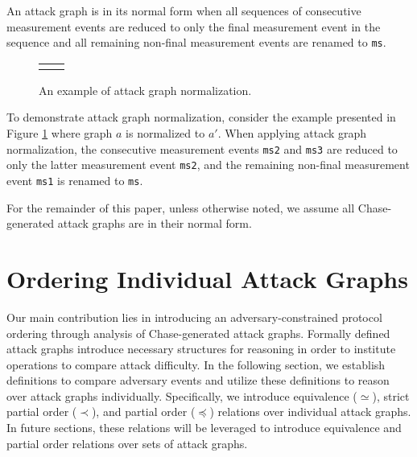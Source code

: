 \documentclass[runningheads]{llncs}
\theoremstyle{definition}
\begin{document}
\begin{definition}
    An attack graph is in its normal form when all sequences of consecutive measurement events are reduced to only the final measurement event in the sequence and all remaining non-final measurement events are renamed to \texttt{ms}. 
\end{definition}

\begin{figure}[htbp]
  \centering 
  \begin{tabular}{c c}
       &  
  \end{tabular}
  \captionsetup{justification=centering,margin=1cm}
  \caption[Example of attack graph normalization]{An example of attack graph normalization.}
  \label{fig:reduce-ex}
\end{figure}


\noindent To demonstrate attack graph normalization, consider the example presented in Figure \ref{fig:reduce-ex} where graph $a$ is normalized to $a'$. When applying attack graph normalization, the consecutive measurement events \texttt{ms2} and \texttt{ms3} are reduced to only the latter measurement event \texttt{ms2}, and the remaining non-final measurement event \texttt{ms1} is renamed to \texttt{ms}.

For the remainder of this paper, unless otherwise noted, we assume all Chase-generated attack graphs are in their normal form.


\section{Ordering Individual Attack Graphs}

Our main contribution lies in introducing an adversary-constrained protocol ordering through analysis of Chase-generated attack graphs. Formally defined attack graphs introduce necessary structures for reasoning in order to institute operations to compare attack difficulty. In the following section, we establish definitions to compare adversary events and utilize these definitions to reason over attack graphs individually. Specifically, we introduce equivalence ($\simeq$), strict partial order ($\prec$), and partial order ($\preceq$) relations over individual attack graphs. In future sections, these relations will be leveraged to introduce equivalence and partial order relations over sets of attack graphs.
\end{document}
